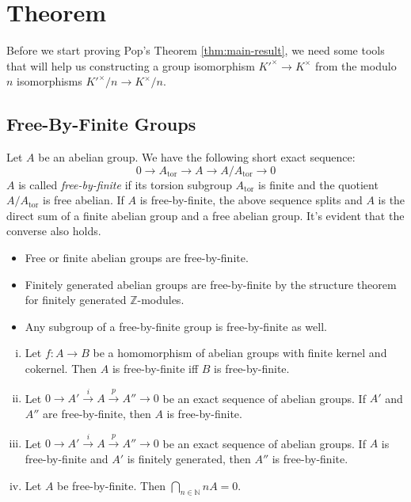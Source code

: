 \chapter{Theorem}

Before we start proving Pop's Theorem \ref{thm:main-result}, we need some tools that will help us constructing a group isomorphism $K'^\times\to K^\times$ from the modulo $n$ isomorphisms $K'^\times/n\to K^\times/n$.

\section{Free-By-Finite Groups}

\begin{definition}\label{5.1}
Let $A$ be an abelian group. We have the following short exact sequence:
\[0\longrightarrow A_\text{tor} \longrightarrow A\longrightarrow A/A_\text{tor}\longrightarrow 0 \]
$A$ is called \textit{free-by-finite} if its torsion subgroup $A_\text{tor}$ is finite and the quotient $A/A_\text{tor}$ is free abelian. If $A$ is free-by-finite, the above sequence splits and $A$ is the direct sum of a finite abelian group and a free abelian group. It's evident that the converse also holds.
\end{definition}

\begin{example}
\begin{itemize}
\item Free or finite abelian groups are free-by-finite.
\item Finitely generated abelian groups are free-by-finite by the structure theorem for finitely generated $\mathbb{Z}$-modules.
\item Any subgroup of a free-by-finite group is free-by-finite as well.
\end{itemize}
\end{example}

\begin{lemma}\label{5.2}
\begin{enumerate}[(i)]
\item Let $f: A\to B$ be a homomorphism of abelian groups with finite kernel and cokernel. Then $A$ is free-by-finite iff $B$ is free-by-finite.
\item Let $0\longrightarrow A'\stackrel{i}{\longrightarrow}A\stackrel{p}{\longrightarrow}A''\longrightarrow 0$ be an exact sequence of abelian groups. If $A'$ and $A''$ are free-by-finite, then $A$ is free-by-finite. 
\item Let $0\longrightarrow A'\stackrel{i}{\longrightarrow}A\stackrel{p}{\longrightarrow}A''\longrightarrow 0$ be an exact sequence of abelian groups. If $A$ is free-by-finite and $A'$ is finitely generated, then $A''$ is free-by-finite.
\item Let $A$ be free-by-finite. Then $\bigcap_{n\in\mathbb{N}}nA=0$.
\end{enumerate}
\end{lemma}

